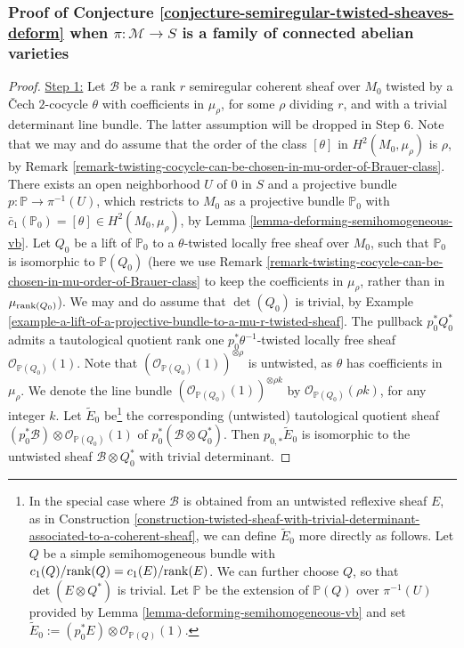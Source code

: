 \documentclass[12pt]{amsart}
\numberwithin{equation}{subsection}
\theoremstyle{plain}
\theoremstyle{definition}
\newcommand{\B}{{\mathcal B}}
\newcommand{\M}{{\mathcal M}}
\newcommand{\PP}{{\mathbb P}}
\newcommand{\StructureSheaf}[1]{{\mathcal O}_{#1}}
\newcommand{\rank}{{\rm rank}}
\begin{document}
\subsubsection{Proof of Conjecture \ref{conjecture-semiregular-twisted-sheaves-deform} when $\pi:\M\rightarrow S$ is a family of connected abelian varieties}
\label{sec-proof-of-the-semiregularity-thm-twisted-sheaves-case-for-families-of-abelian-varieties}
\begin{proof}
\underline{Step 1:}
Let $\B$ be a rank $r$ semiregular coherent sheaf over $M_0$ twisted by a \v{C}ech $2$-cocycle $\theta$ with coefficients in $\mu_\rho$, for some $\rho$ dividing $r$, and with a trivial determinant line bundle. The latter assumption will be dropped in Step 6.
Note that we may and do assume that the order of the class $[\theta]$ in $H^2(M_0,\mu_\rho)$ is $\rho$, by Remark \ref{remark-twisting-cocycle-can-be-chosen-in-mu-order-of-Brauer-class}.
There exists an open neighborhood $U$ of $0$ in $S$ and a projective bundle $p:\PP\rightarrow \pi^{-1}(U)$, which restricts to $M_0$ as a projective bundle $\PP_0$ with $\bar{c}_1(\PP_0)=[\theta]\in H^2(M_0,\mu_\rho)$, by Lemma \ref{lemma-deforming-semihomogeneous-vb}. Let $Q_0$ be a lift of $\PP_0$ to a
$\theta$-twisted locally free sheaf over $M_0$, such that $\PP_0$ is isomorphic to $\PP(Q_0)$ (here we use Remark \ref{remark-twisting-cocycle-can-be-chosen-in-mu-order-of-Brauer-class} to keep the coefficients in $\mu_\rho$, rather than in $\mu_{\rank(Q_0)}$). We may and do assume that $\det(Q_0)$ is trivial, by Example \ref{example-a-lift-of-a-projective-bundle-to-a-mu-r-twisted-sheaf}. 
The pullback $p_0^*Q_0^*$ admits a tautological quotient rank one $p_0^*\theta^{-1}$-twisted locally free sheaf $\StructureSheaf{\PP(Q_0)}(1)$.
Note that $(\StructureSheaf{\PP(Q_0)}(1))^{\otimes \rho}$ is untwisted, as $\theta$ has coefficients in $\mu_\rho$. 
We denote the line bundle $(\StructureSheaf{\PP(Q_0)}(1))^{\otimes \rho k}$ by $\StructureSheaf{\PP(Q_0)}(\rho k)$, for any integer $k$.
Let $\tilde{E}_0$ 
be\footnote{In the special case where $\B$ is obtained from an untwisted reflexive sheaf $E$, as in Construction \ref{construction-twisted-sheaf-with-trivial-determinant-associated-to-a-coherent-sheaf}, we can define $\tilde{E}_0$ more directly as follows. Let $Q$ be a simple semihomogeneous bundle with $c_1(Q)/\rank(Q)=c_1(E)/\rank(E)$. We can further choose $Q$, so that $\det(E\otimes Q^*)$ is trivial.
Let $\PP$ be the extension of $\PP(Q)$ over $\pi^{-1}(U)$ provided by Lemma \ref{lemma-deforming-semihomogeneous-vb} and set $\tilde{E}_0:=(p_0^*E)\otimes\StructureSheaf{\PP(Q)}(1)$.
} 
the corresponding (untwisted) tautological quotient sheaf $(p_0^*\B)\otimes\StructureSheaf{\PP(Q_0)}(1)$
of $p_0^*(\B\otimes Q_0^*).$ Then $p_{0,*}\tilde{E}_0$ is isomorphic to the untwisted sheaf $\B\otimes Q_0^*$ with trivial determinant. 



\end{proof}
\end{document}
